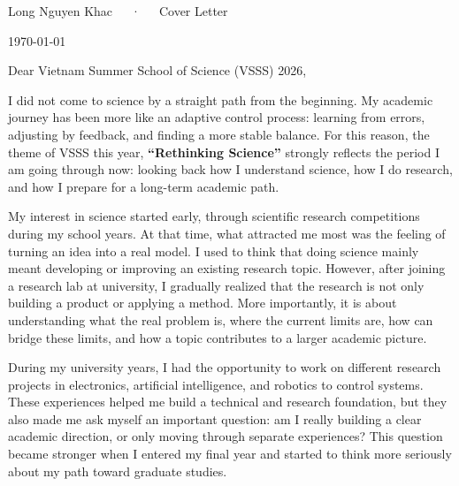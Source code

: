 \documentclass[11pt, a4paper]{src/awesome-cv}
\begin{document}
\makecvfooter
  {}
  {Long Nguyen Khac~~~·~~~Cover Letter}
  {\thepage}


\begin{flushright}
{\today}
\end{flushright}

\vspace{0.3cm}

Dear Vietnam Summer School of Science (VSSS) 2026,

\vspace{0.18cm}

I did not come to science by a straight path from the beginning. My academic journey has been more like an adaptive control process: learning from errors, adjusting by feedback, and finding a more stable balance. For this reason, the theme of VSSS this year, \textbf{“Rethinking Science”} strongly reflects the period I am going through now: looking back how I understand science, how I do research, and how I prepare for a long-term academic path.

\vspace{0.18cm}

My interest in science started early, through scientific research competitions during my school years. At that time, what attracted me most was the feeling of turning an idea into a real model. I used to think that doing science mainly meant developing or improving an existing research topic. However, after joining a research lab at university, I gradually realized that the research is not only building a product or applying a method. More importantly, it is about understanding what the real problem is, where the current limits are, how can bridge these limits, and how a topic contributes to a larger academic picture.

\vspace{0.18cm}

During my university years, I had the opportunity to work on different research projects in electronics, artificial intelligence, and robotics to control systems. These experiences helped me build a technical and research foundation, but they also made me ask myself an important question: am I really building a clear academic direction, or only moving through separate experiences? This question became stronger when I entered my final year and started to think more seriously about my path toward graduate studies.
\end{document}
